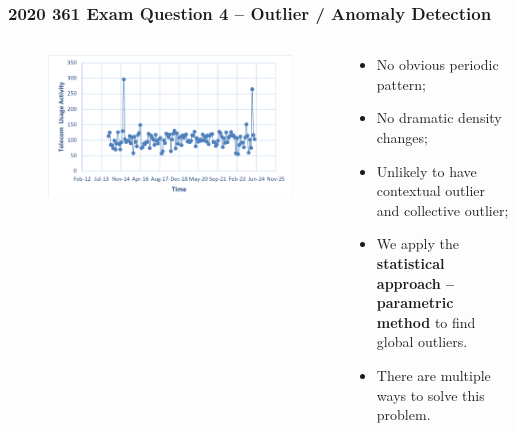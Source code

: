 \documentclass[aspectratio=169, 10pt]{beamer}
\begin{document}
\begin{frame}
    \frametitle{2020 361 Exam Question 4 -- Outlier / Anomaly Detection}

    \begin{columns}[]
        \begin{column}{0.5\textwidth}
            \begin{figure}
                \centering
                \includegraphics[width=\textwidth]{../imgs/question4.png}
            \end{figure}
        \end{column}
        \begin{column}{0.5\textwidth}
            \begin{itemize}
                \item No obvious periodic pattern;
                \item No dramatic density changes;
                \item Unlikely to have contextual outlier and collective outlier;
                \item We apply the \textbf{statistical approach -- parametric method} to find global outliers.
                \item There are multiple ways to solve this problem.
            \end{itemize}
        \end{column}
    \end{columns}
    
\end{frame}
\end{document}
